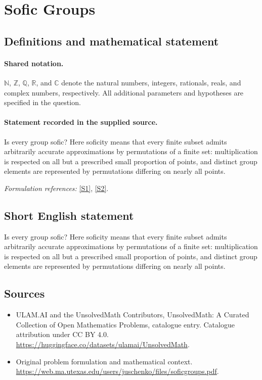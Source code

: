 \documentclass[11pt]{article}
\newcommand{\sref}[2]{\hyperlink{source:#1:#2}{[S#2]}}
\begin{document}
\section{Sofic Groups}\label{statement}

\subsection{Definitions and mathematical statement}

\paragraph{Shared notation.}$\mathbb N$, $\mathbb Z$, $\mathbb Q$, $\mathbb R$, and $\mathbb C$ denote the natural numbers, integers, rationals, reals, and complex numbers, respectively. All additional parameters and hypotheses are specified in the question.


\paragraph{Statement recorded in the supplied source.}
Is every group sofic? Here soficity means that every finite subset admits arbitrarily accurate approximations by permutations of a finite set: multiplication is respected on all but a prescribed small proportion of points, and distinct group elements are represented by permutations differing on nearly all points.
\par\smallskip\textit{Formulation references:} \sref{statement}{1}, \sref{statement}{2}.
\subsection{Short English statement}
Is every group sofic? Here soficity means that every finite subset admits arbitrarily accurate approximations by permutations of a finite set: multiplication is respected on all but a prescribed small proportion of points, and distinct group elements are represented by permutations differing on nearly all points.
\subsection{Sources}
\begin{itemize}
\item[\hypertarget{source:statement:1}{S1}] ULAM.AI and the UnsolvedMath Contributors, UnsolvedMath: A Curated Collection of Open Mathematics Problems, catalogue entry. Catalogue attribution under CC BY 4.0.
\url{https://huggingface.co/datasets/ulamai/UnsolvedMath}.
\item[\hypertarget{source:statement:2}{S2}] Original problem formulation and mathematical context.
\url{https://web.ma.utexas.edu/users/juschenko/files/soficgroups.pdf}.
\end{itemize}
\label{end:statement}
\end{document}
